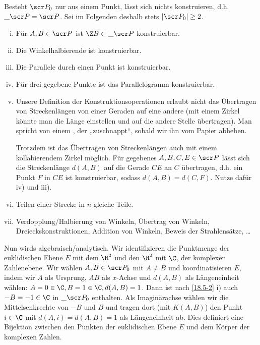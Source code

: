 Besteht $\scr P_0$ nur aus einem Punkt, lässt sich nichts konstruieren, d.h. $\_{\scr P} = \scr P$.
Sei im Folgenden deshalb stets $|\scr P_0| \ge 2$.


\begin{ex} \label{18.5-2}
	\begin{enumerate}[i)]
		\item
			Für $A, B \in \scr P$ ist $\Z B \subset \_{\scr P}$ konstruierbar.
		\item
			Die Winkelhalbierende ist konstruierbar.
		\item
			Die Parallele durch einen Punkt ist konstruierbar.
		\item
			Für drei gegebene Punkte ist das Parallelogramm konstruierbar.
		\item
			Unsere Definition der Konstruktionsoperationen erlaubt nicht das Übertragen von Streckenlängen von einer Geraden auf eine andere (mit einem Zirkel könnte man die Länge einstellen und auf die andere Stelle übertragen).
			Man spricht von einem , der „zuschnappt“, sobald wir ihn vom Papier abheben.

			Trotzdem ist das Übertragen von Streckenlängen auch mit einem kollabierendem Zirkel möglich.
			Für gegebenes $A, B, C, E \in \scr P$ lässt sich die Streckenlänge $d(A, B)$ auf die Gerade $CE$ an $C$ übertragen, d.h. ein Punkt $F$ in $CE$ ist konstruierbar, sodass $d(A, B) = d(C, F)$.
			Nutze dafür iv) und iii).
		\item
			Teilen einer Strecke in $n$ gleiche Teile.
		\item
			Verdopplung/Halbierung von Winkeln, Übertrag von Winkeln, Dreieckskonstruktionen, Addition von Winkeln, Beweis der Strahlensätze, \dots
	\end{enumerate}
\end{ex}

Nun wirds algebraisch/analytisch.
Wir identifizieren die Punktmenge der euklidischen Ebene $E$ mit dem $\R^2$ und den $\R^2$ mit $\C$, der komplexen Zahlenebene.
Wir wählen $A, B \in \scr P_0$ mit $A \neq B$ und koordinatisieren $E$, indem wir $A$ als Ursprung, $AB$ als $x$-Achse und $d(A,B)$ als Längeneinheit wählen: $A = 0 \in \C, B = 1 \in \C, d(A, B) = 1$.
Dann ist nach \ref{18.5-2} i) auch $-B = -1 \in \C$ in $\_{\scr P_0}$ enthalten.
Als Imaginärachse wählen wir die Mittelsenkrechte von $-B$ und $B$ und tragen dort (mit $K(A,B)$) den Punkt $i \in \C$ mit $d(A, i) = d(A, B) = 1$ als Längeneinheit ab.
Dies definiert eine Bijektion zwischen den Punkten der euklidischen Ebene $E$ und dem Körper der komplexen Zahlen.

